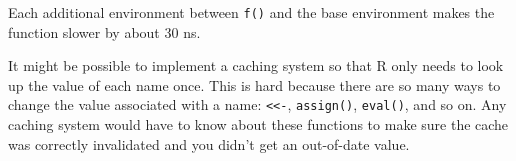 \begin{Shaded}
\begin{Highlighting}[]
\StringTok{ } \NormalTok{()) \{}
  \StringTok{ }\NormalTok{(}\NormalTok{(}\NormalTok{(}
   \NormalTok{(} 
\NormalTok{\}}
\StringTok{ }
  \StringTok{ }
\NormalTok{\}}
\StringTok{ }\NormalTok{())}
\StringTok{ }\NormalTok{(}
\StringTok{ }\NormalTok{(}

\NormalTok{(}
  \NormalTok{(}\NormalTok{, }\NormalTok{),}
  \NormalTok{(}\NormalTok{, }\NormalTok{),}
  \NormalTok{(}\NormalTok{, }\NormalTok{),}
  \NormalTok{(}\NormalTok{, }\NormalTok{),}
   
\NormalTok{)}
\end{Highlighting}
\end{Shaded}

Each additional environment between \texttt{f()} and the base
environment makes the function slower by about 30 ns.

It might be possible to implement a caching system so that R only needs
to look up the value of each name once. This is hard because there are
so many ways to change the value associated with a name:
\texttt{\textless{}\textless{}-}, \texttt{assign()}, \texttt{eval()},
and so on. Any caching system would have to know about these functions
to make sure the cache was correctly invalidated and you didn't get an
out-of-date value. \indexc{<<-}

